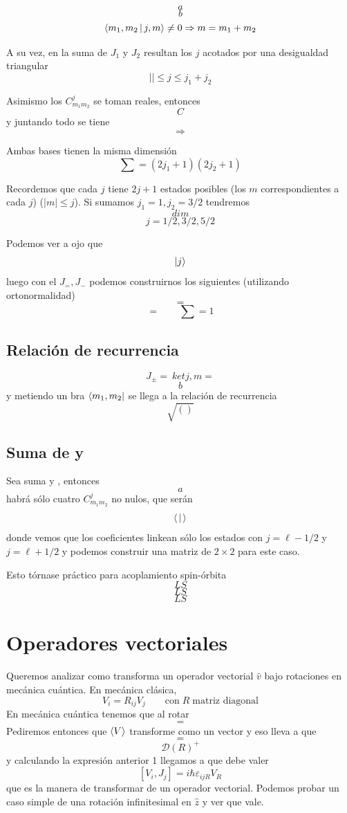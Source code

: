 \documentclass[10pt,oneside]{CBFT_book}
\begin{document}
\[
	a
\]
\[
	b
\]
\[
	\Braket{m_1,m_2| j,m} \neq 0 \Rightarrow m = m_1 + m_2
\]

A su vez, en la suma de $J_1$ y $J_2$ resultan los $j$ acotados por una desigualdad triangular 
\[
	|| \leq j \leq j_1 + j_2
\]

Asimismo los $C_{m_1 m_2}^j$ se toman reales, entonces 
\[
	C
\]
y juntando todo se tiene 
\[
	\Rightarrow
\]

Ambas bases tienen la misma dimensión
\[
	\sum = (2j_1 + 1)(2j_2 + 1)
\]

Recordemos que cada $j$ tiene $2j+1$ estados posibles (los $m$ correspondientes a cada $j$) ($|m|\leq j$). Si sumamos 
$j_1=1, j_2=3/2$ tendremos 
\[
	dim
\]
\[
	j = 1/2, 3/2, 5/2
\]

Podemos ver a ojo que 
\[
	\Ket{j}
\]
luego con el $J_=, J_-$ podemos construirnos los siguientes (utilizando ortonormalidad)
\[
	= 
\]
\[
	= \qquad \sum = 1
\]

\subsection{Relación de recurrencia}

\[
	J_\pm = \ ket{j,m} = 
\]
\[
	b
\]
y metiendo un bra $\Bra{m_1,m_2}$ se llega a la relación de recurrencia
\[
	\sqrt{()}
\]

\subsection{Suma de  y }

Sea suma  y , entonces 
\[
	a
\]
habrá sólo cuatro $C_{m_1 m_2}^j$ no nulos, que serán 
\[
	\Braket{|}
\]
donde vemos que los coeficientes linkean sólo los estados con $j=\ell-1/2$ y $j=\ell+1/2$ y podemos construir una 
matriz de $2\times 2$ para este caso.

Esto tórnase práctico para acoplamiento spin-órbita 
\[
	LS
\]
\[
	LS
\]
\[
	LS
\]

\section{Operadores vectoriales}

Queremos analizar como transforma un operador vectorial $\hat{v}$ bajo rotaciones en mecánica cuántica.
En mecánica clásica,
\[
	V_i = R_{ij} V_j \qquad \text{con} \; R \; \text{matriz diagonal}
\]
En mecánica cuántica tenemos que al rotar
\[
	=
\]
Pediremos entonces que $\Braket{V}$ transforme como un vector y eso lleva a que 
\[
	=
\]
\[
	\mathcal{D}(R)^+
\]
y calculando la expresión anterior 1 llegamos a que debe valer
\[
	[V_i,J_j] =  i\hbar \varepsilon_{ijR}V_R
\]
que es la manera de transformar de un operador vectorial. Podemos probar un caso simple de una rotación infinitesimal 
en $\hat{z}$ y ver que vale.
\end{document}
